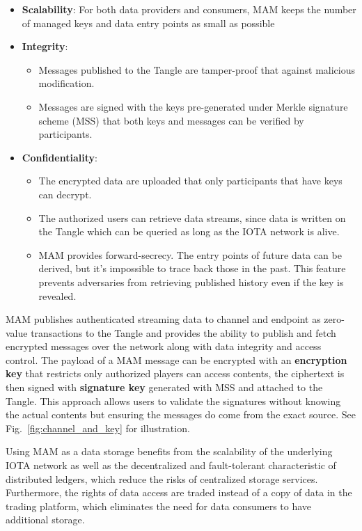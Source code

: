 \documentclass[conference]{IEEEtran}
\begin{document}
\begin{itemize}
    \item \textbf{Scalability}: For both data providers and consumers, MAM keeps the number of managed keys and data entry points as small as possible
    \item \textbf{Integrity}: 
	\begin{itemize}    	
        \item Messages published to the Tangle are tamper-proof that against malicious modification.
    	\item Messages are signed with the keys pre-generated under Merkle signature scheme\cite{MSS} (MSS) that both keys and messages can be verified by participants.
    \end{itemize}
    \item \textbf{Confidentiality}:
    \begin{itemize}    	
    	\item The encrypted data are uploaded that only participants that have keys can decrypt.
    	\item The authorized users can retrieve data streams, since data is written on the Tangle which can be queried as long as the IOTA network is alive.
    	\item MAM provides forward-secrecy. The entry points of future data can be derived, but it's impossible to trace back those in the past. This feature prevents adversaries from retrieving published history even if the key is revealed.
    \end{itemize}
\end{itemize}

MAM publishes authenticated streaming data to channel and endpoint as zero-value transactions to the Tangle and provides the ability to publish and fetch encrypted messages over the network along with data integrity and access control. The payload of a MAM message can be encrypted with an \textbf{encryption key} that restricts only authorized players can access contents, the ciphertext is then signed with \textbf{signature key} generated with MSS and attached to the Tangle. This approach allows users to validate the signatures without knowing the actual contents but ensuring the messages do come from the exact source. See Fig.~\ref{fig:channel_and_key} for illustration. 

Using MAM as a data storage benefits from the scalability of the underlying IOTA network as well as the decentralized and fault-tolerant characteristic of distributed ledgers, which reduce the risks of centralized storage services. Furthermore, the rights of data access are traded instead of a copy of data in the trading platform, which eliminates the need for data consumers to have additional storage.
\end{document}
